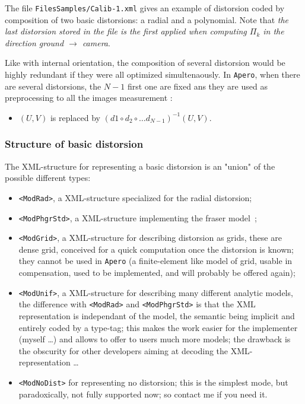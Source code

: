 The file {\tt FilesSamples/Calib-1.xml} gives an example of distorsion coded
by composition of two basic distorsions: a radial  and a polynomial. Note that
\emph{the last distorsion stored in the file is the first applied when computing
$\Pi_k$ in the direction ground $\rightarrow$  camera}.

Like with internal orientation, the composition of several distorsion
would be   highly redundant if they were all optimized simultenaously.
In {\tt Apero}, when there are several distorsions, the $N-1$ first one are
fixed ans they are used as preprocessing to all the images measurement :

\begin{itemize}
       \item $(U,V)$ is replaced by $(d1 \circ d_2 \circ \dots d_{N-1}) ^{-1}(U,V)$.
\end{itemize}


\subsubsection{Structure of basic distorsion}

The XML-structure for representing a basic distorsion is an "union" of the possible
different types:

\begin{itemize}
   \item {\tt <ModRad>}, a XML-structure specialized for the radial distorsion;

   \item {\tt <ModPhgrStd>}, a XML-structure implementing the fraser model~\cite{fraser1997digital};

   \item {\tt <ModGrid>}, a XML-structure for describing distorsion as grids, these are dense
         grid, conceived for a quick computation once the distorsion is known; they cannot
         be used in {\tt Apero} (a finite-element like model of grid, usable in compensation,
         used  to be implemented, and will probably be offered again);

   \item {\tt <ModUnif>}, a XML-structure for describing many different analytic models, the
         difference with {\tt <ModRad>} and {\tt <ModPhgrStd>} is that the XML representation
         is independant of the model, the semantic being implicit and entirely coded by a type-tag;
         this makes the work easier for the implementer (myself \dots) and allows to offer to users
         much more models; the drawback is the obscurity for other developers aiming at decoding
         the XML-representation \dots

   \item {\tt <ModNoDist>} for representing no distorsion; this is the simplest mode, but paradoxically,
         not fully supported now; so contact me if you need it.
\end{itemize}

